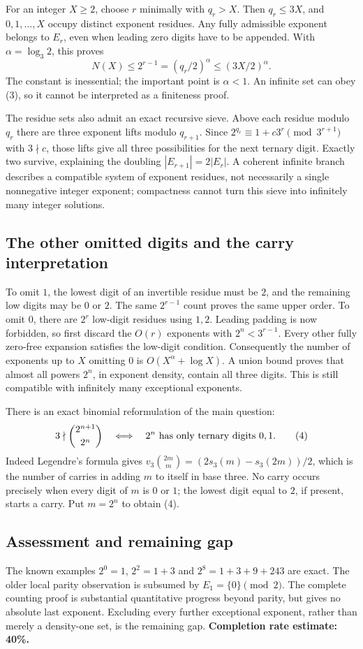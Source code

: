 For an integer $X\ge2$, choose $r$ minimally with $q_r>X$. Then $q_r\le3X$, and $0,1,\ldots,X$ occupy distinct exponent residues. Any fully admissible exponent belongs to $E_r$, even when leading zero digits have to be appended. With $\alpha=\log_3 2$, this proves
\[
 N(X)\le2^{r-1}=(q_r/2)^\alpha
 \le(3X/2)^\alpha. \tag{3}
\]
The constant is inessential; the important point is $\alpha<1$. An infinite set can obey (3), so it cannot be interpreted as a finiteness proof.

The residue sets also admit an exact recursive sieve. Above each residue modulo $q_r$ there are three exponent lifts modulo $q_{r+1}$. Since $2^{q_r}\equiv1+c3^r\pmod{3^{r+1}}$ with $3\nmid c$, those lifts give all three possibilities for the next ternary digit. Exactly two survive, explaining the doubling $|E_{r+1}|=2|E_r|$. A coherent infinite branch describes a compatible system of exponent residues, not necessarily a single nonnegative integer exponent; compactness cannot turn this sieve into infinitely many integer solutions.

\subsection*{The other omitted digits and the carry interpretation}
To omit $1$, the lowest digit of an invertible residue must be $2$, and the remaining low digits may be $0$ or $2$. The same $2^{r-1}$ count proves the same upper order.
To omit $0$, there are $2^r$ low-digit residues using $1,2$. Leading padding is now forbidden, so first discard the $O(r)$ exponents with $2^n<3^{r-1}$. Every other fully zero-free expansion satisfies the low-digit condition. Consequently the number of exponents up to $X$ omitting $0$ is $O(X^\alpha+\log X)$. A union bound proves that almost all powers $2^n$, in exponent density, contain all three digits. This is still compatible with infinitely many exceptional exponents.

There is an exact binomial reformulation of the main question:
\[
 3\nmid\binom{2^{n+1}}{2^n}
 \quad\Longleftrightarrow\quad
 2^n\hbox{ has only ternary digits }0,1. \tag{4}
\]
Indeed Legendre's formula gives $v_3\binom{2m}{m}=(2s_3(m)-s_3(2m))/2$, which is the number of carries in adding $m$ to itself in base three. No carry occurs precisely when every digit of $m$ is $0$ or $1$; the lowest digit equal to $2$, if present, starts a carry. Put $m=2^n$ to obtain (4).

\subsection*{Assessment and remaining gap}
The known examples $2^0=1$, $2^2=1+3$ and $2^8=1+3+9+243$ are exact. The older local parity observation is subsumed by $E_1=\{0\}\pmod2$. The complete counting proof is substantial quantitative progress beyond parity, but gives no absolute last exponent. Excluding every further exceptional exponent, rather than merely a density-one set, is the remaining gap.
\textbf{Completion rate estimate: 40\%.}
